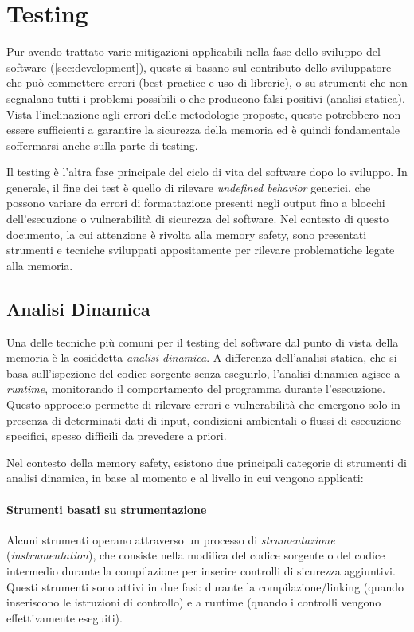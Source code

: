 \section{Testing}
\label{sec:testing}

Pur avendo trattato varie mitigazioni applicabili nella fase dello sviluppo del software
(\autoref{sec:development}), queste si basano sul contributo dello sviluppatore
che può commettere errori (best practice e uso di librerie), o su strumenti che non
segnalano tutti i problemi possibili o che producono falsi positivi (analisi
statica). Vista l'inclinazione agli errori delle metodologie proposte, queste potrebbero
non essere sufficienti a garantire la sicurezza della memoria ed è quindi fondamentale
soffermarsi anche sulla parte di testing.

Il testing è l'altra fase principale del ciclo di vita del software dopo lo sviluppo.
In generale, il fine dei test è quello di rilevare \textit{undefined behavior}
generici, che possono variare da errori di formattazione presenti negli output fino
a blocchi dell'esecuzione o vulnerabilità di sicurezza del software. Nel
contesto di questo documento, la cui attenzione è rivolta alla memory safety,
sono presentati strumenti e tecniche sviluppati appositamente per rilevare
problematiche legate alla memoria.

\subsection{Analisi Dinamica}
\label{sec:analisi-dinamica}

Una delle tecniche più comuni per il testing del software dal punto di vista della
memoria è la cosiddetta \textit{analisi dinamica}. A differenza dell'analisi statica,
che si basa sull'ispezione del codice sorgente senza eseguirlo, l'analisi dinamica
agisce a \textit{runtime}, monitorando il comportamento del programma durante l'esecuzione.
Questo approccio permette di rilevare errori e vulnerabilità che emergono solo
in presenza di determinati dati di input, condizioni ambientali o flussi di esecuzione
specifici, spesso difficili da prevedere a priori.

Nel contesto della memory safety, esistono due principali categorie di strumenti
di analisi dinamica, in base al momento e al livello in cui vengono applicati:

\paragraph{Strumenti basati su strumentazione}
Alcuni strumenti operano attraverso un processo di \textit{strumentazione} (\textit{instrumentation}),
che consiste nella modifica del codice sorgente o del codice intermedio durante
la compilazione per inserire controlli di sicurezza aggiuntivi. Questi strumenti
sono attivi in due fasi: durante la compilazione/linking (quando inseriscono le istruzioni
di controllo) e a runtime (quando i controlli vengono effettivamente eseguiti).


